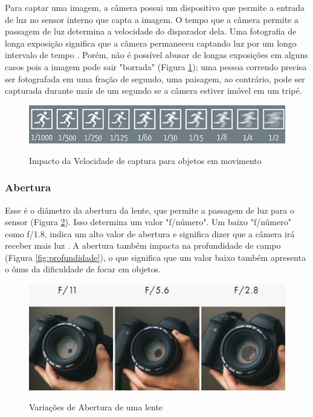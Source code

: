 Para captar uma imagem, a câmera possui um dispositivo que permite a entrada de luz no sensor interno que capta a imagem. O tempo que a câmera permite a passagem de luz determina a velocidade do disparador dela. Uma fotografia de longa exposição significa que a câmera permaneceu captando luz por um longo intervalo de tempo \cite{book:bbcsky}. Porém, não é possível abusar de longas exposições em alguns casos pois a imagem pode sair "borrada" (Figura \ref{fig:velocidade}); uma pessoa correndo precisa ser fotografada em uma fração de segundo, uma paisagem, ao contrário, pode ser capturada durante mais de um segundo se a câmera estiver imóvel em um tripé.  

\begin{figure}[!htb]
	\centering
	\caption{Impacto da Velocidade de captura para objetos em movimento}
	\includegraphics[width=0.7\linewidth]{figuras/velocidade}
	\label{fig:velocidade}
\end{figure}

\subsubsection{Abertura}

Esse é o diâmetro da abertura da lente, que permite a passagem de luz para o sensor (Figura \ref{fig:abertura}). Isso determina um valor "f/número". Um baixo "f/número" como f/1.8, indica um alto valor de abertura e significa dizer que a câmera irá receber mais luz \cite{book:bbcsky}. A abertura também impacta na profundidade de campo (Figura \ref{fig:profundidade}), o que significa que um valor baixo também apresenta o ônus da dificuldade de focar em objetos.

\begin{figure}[!htb]
	\centering
	\caption{Variações de Abertura de uma lente}
	\includegraphics[width=0.7\linewidth]{figuras/abertura}
	\label{fig:abertura}
\end{figure}

